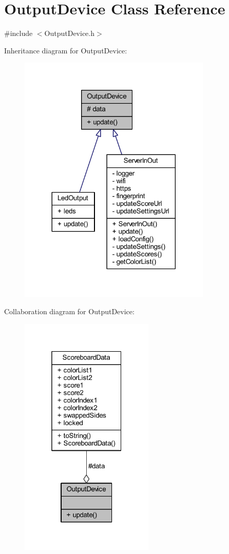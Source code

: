 \hypertarget{class_output_device}{}\section{Output\+Device Class Reference}
\label{class_output_device}


{\ttfamily \#include $<$Output\+Device.\+h$>$}



Inheritance diagram for Output\+Device\+:
\nopagebreak
\begin{figure}[H]
\begin{center}
\leavevmode
\includegraphics[width=260pt]{class_output_device__inherit__graph}
\end{center}
\end{figure}


Collaboration diagram for Output\+Device\+:
\nopagebreak
\begin{figure}[H]
\begin{center}
\leavevmode
\includegraphics[width=181pt]{class_output_device__coll__graph}
\end{center}
\end{figure}
